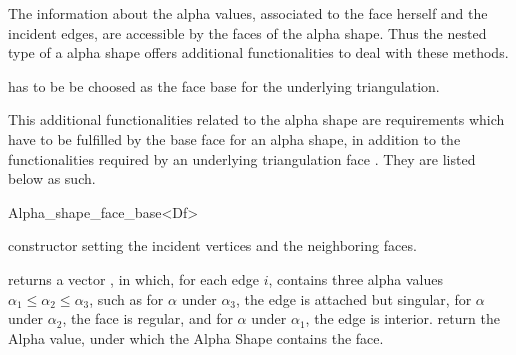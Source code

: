 The information about the alpha values, associated to the face herself and the
incident edges, are accessible by the 
faces of the alpha shape. Thus the nested 
type of a alpha shape offers additional functionalities to deal with these
methods.

 has to be be choosed as the face base for the underlying triangulation. 

This additional functionalities related to the alpha shape
are requirements which have to be fulfilled
by the base face  for an alpha shape,
in addition to the functionalities required by an underlying triangulation face .
They are listed below as such.

\ccInheritsFrom


\begin{ccClass}{Alpha_shape_face_base<Df>}

\ccTypes



\ccCreation

\begin{ccAdvanced}

\ccGlue
{}
\ccGlue
{} 
{constructor setting the incident vertices and the neighboring faces.}

\end{ccAdvanced}

{returns a vector , in which, for each edge $i$,  contains
three alpha values
 $\alpha_1 \leq \alpha_2 \leq \alpha_3$, such as for
$\alpha$ under $\alpha_3$, the edge is attached but singular,
for $\alpha$ under $\alpha_2$, the face is regular, and for $\alpha$
under $\alpha_1$, the edge is interior.}
{return the Alpha value, under which the Alpha Shape contains the
face.}


\end{ccClass}
